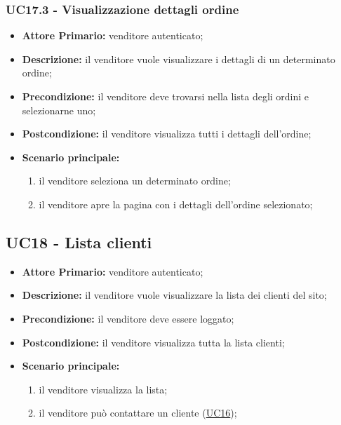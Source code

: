 \subsubsection{UC17.3 - Visualizzazione dettagli ordine}
\label{UC17.3}
\begin{itemize}
    \item \textbf{Attore Primario:} venditore autenticato;
    \item \textbf{Descrizione:} il venditore vuole visualizzare i dettagli di un determinato ordine;
    \item \textbf{Precondizione:} il venditore deve trovarsi nella lista degli ordini e selezionarne uno;
    \item \textbf{Postcondizione:} il venditore visualizza tutti i dettagli dell'ordine;
    \item \textbf{Scenario principale:}
    \begin{enumerate}
        \item il venditore seleziona un determinato ordine;
        \item il venditore apre la pagina con i dettagli dell'ordine selezionato;
    \end{enumerate}
\end{itemize}

\subsection{UC18 - Lista clienti}
\label{UC18}
\begin{itemize}
    \item \textbf{Attore Primario:} venditore autenticato;
    \item \textbf{Descrizione:} il venditore vuole visualizzare la lista dei clienti del sito;
    \item \textbf{Precondizione:} il venditore deve essere loggato;
    \item \textbf{Postcondizione:} il venditore visualizza tutta la lista clienti;
    \item \textbf{Scenario principale:}
    \begin{enumerate}
        \item il venditore visualizza la lista;
         \item il venditore può contattare un cliente (\hyperref[UC16]{UC16});
    \end{enumerate}
\end{itemize}

